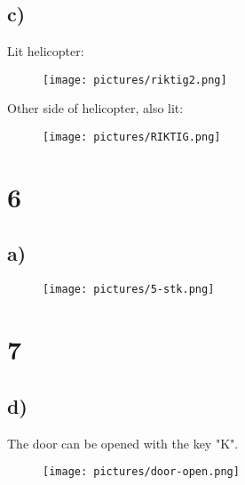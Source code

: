 \documentclass{article}
\begin{document}
\subsection{c)}
Lit helicopter:
\begin{figure}[h]
    \centering
    \texttt{[image: pictures/riktig2.png]}
\end{figure}
\FloatBarrier
Other side of helicopter, also lit:
\begin{figure}[h]
    \centering
    \texttt{[image: pictures/RIKTIG.png]}
\end{figure}

\section{6}
\subsection{a)}
\begin{figure}[h]
    \centering
    \texttt{[image: pictures/5-stk.png]}
\end{figure}
\FloatBarrier

\section{7}
\subsection{d)}
The door can be opened with the key "K".
\begin{figure}[h]
    \centering
    \texttt{[image: pictures/door-open.png]}
\end{figure}
\end{document}
